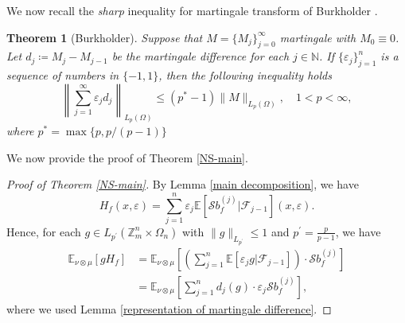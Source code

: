 \documentclass{amsart}
\numberwithin{equation}{section}
\newtheorem{thm}{Theorem}[section]
\newcommand{\Z}{{\mathbb{Z}^{n}_{m}}}
\begin{document}
We now recall the \emph{sharp} inequality for martingale transform of Burkholder \cite{Bur1984}.
\begin{thm}[Burkholder]\label{Burkholder martingale transform}
Suppose that $M=\{M_{j}\}_{j=0}^{\infty}$ martingale with $M_{0}\equiv 0$. Let $d_{j}\coloneqq M_{j}-M_{j-1}$ be the martingale difference for each $j\in \mathbb{N}$. If $\{\varepsilon_{j}\}_{j=1}^{n}$ is a sequence of numbers in $\{-1,1\}$, then the following inequality holds
\[
\left\|\sum_{j=1}^{\infty}\varepsilon_{j}d_{j}\right\|_{L_{p}(\Omega)}\leq (p^{*}-1)\|M\|_{L_{p}(\Omega)},  \quad 1<p<\infty,
\]
where $p^{*}=\max\{p,p/(p-1)\}$
\end{thm}

We now provide the proof of Theorem \ref{NS-main}. 
\begin{proof}[Proof of Theorem \ref{NS-main}]
By Lemma \ref{main decomposition}, we have
\[
H_{f}(x,\varepsilon)=\sum_{j=1}^{n}\varepsilon_{j}\mathbb{E}\left[\mathcal{S}b^{(j)}_{f}|\mathcal{F}_{j-1}\right](x,\varepsilon).
\]
Hence, for each $g\in L_{p^{\prime}}(\Z\times \Omega_{n})$ with $\|g\|_{L_{p^{\prime}}}\leq 1$ and $p^{\prime}=\frac{p}{p-1}$, we have
\begin{equation}\label{martingale transform 1}
\begin{split}
\mathbb{E}_{\nu\otimes \mu}\left[gH_{f}\right]&=\mathbb{E}_{\nu\otimes \mu}\left[\left(\sum_{j=1}^{n}\mathbb{E}[\varepsilon_{j} g|\mathcal{F}_{j-1}]\right)\cdot\mathcal{S}b^{(j)}_{f}\right]\\
&=\mathbb{E}_{\nu\otimes \mu}\left[\sum_{j=1}^{n}d_{j}(g)\cdot \varepsilon_{j} \mathcal{S}b^{(j)}_{f}\right],
\end{split}
\end{equation}
where we used Lemma \ref{representation of martingale difference}.


\end{proof}
\end{document}
